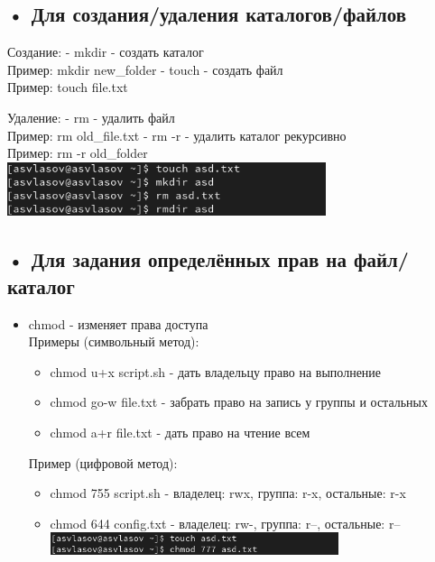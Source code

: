\documentclass[
  12pt,
  a4paper,
  DIV=11,
  numbers=noendperiod]{scrreprt}
\providecommand{\tightlist}{%
  \setlength{\itemsep}{0pt}\setlength{\parskip}{0pt}}\usepackage{longtable,booktabs,array}
\begin{document}
\subsection{• Для создания/удаления
каталогов/файлов}\label{ux434ux43bux44f-ux441ux43eux437ux434ux430ux43dux438ux44fux443ux434ux430ux43bux435ux43dux438ux44f-ux43aux430ux442ux430ux43bux43eux433ux43eux432ux444ux430ux439ux43bux43eux432}

Создание: - mkdir - создать каталог\\
Пример: mkdir new\_folder - touch - создать файл\\
Пример: touch file.txt

Удаление: - rm - удалить файл\\
Пример: rm old\_file.txt - rm -r - удалить каталог рекурсивно\\
Пример: rm -r old\_folder
\includegraphics[width=0.7\textwidth,height=\textheight]{image/22.png}

\subsection{• Для задания определённых прав на
файл/каталог}\label{ux434ux43bux44f-ux437ux430ux434ux430ux43dux438ux44f-ux43eux43fux440ux435ux434ux435ux43bux451ux43dux43dux44bux445-ux43fux440ux430ux432-ux43dux430-ux444ux430ux439ux43bux43aux430ux442ux430ux43bux43eux433}

\begin{itemize}
\tightlist
\item
  chmod - изменяет права доступа\\
  Примеры (символьный метод):

  \begin{itemize}
  \tightlist
  \item
    chmod u+x script.sh - дать владельцу право на выполнение
  \item
    chmod go-w file.txt - забрать право на запись у группы и остальных
  \item
    chmod a+r file.txt - дать право на чтение всем
  \end{itemize}

  Пример (цифровой метод):

  \begin{itemize}
  \tightlist
  \item
    chmod 755 script.sh - владелец: rwx, группа: r-x, остальные: r-x
  \item
    chmod 644 config.txt - владелец: rw-, группа: r--, остальные: r--
    \includegraphics[width=0.7\textwidth,height=\textheight]{image/23.png}
  \end{itemize}
\end{itemize}
\end{document}
